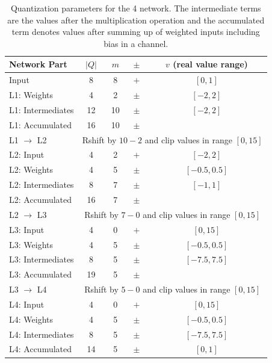 \begin{table}[hbt]
  \centering
  \begin{tabular}{lcccc}
	\toprule
    Network Part 	  & $|Q|$ & $m$ & $\pm$ & $v$ (real value range) \\
	\midrule
    Input 		 	  &  8    & 8  & $+$   & $[0,1]  $ \\
    L1: Weights 	  &  4    & 2  & $\pm$ & $[-2,2] $ \\
    L1: Intermediates & 12    & 10 & $\pm$ & $[-2,2] $ \\
    L1: Accumulated   & 16    & 10 & $\pm$ & 		   \\
    \midrule
    L1 $\to$ L2 	  & \multicolumn{4}{c}{Rshift by $10-2$ and clip values in range $[0,15]$} \\
    \midrule
    L2: Input 		  &  4    & 2  & $+$   & $[-2,2] $ 	   \\
    L2: Weights 	  &  4    & 5  & $\pm$ & $[-0.5,0.5] $ \\
    L2: Intermediates &  8    & 7  & $\pm$ & $[-1,1] $ \\
    L2: Accumulated   & 16    & 7  & $\pm$ &  			   \\
    \midrule
    L2 $\to$ L3 	  & \multicolumn{4}{c}{Rshift by $7-0$ and clip values in range $[0,15]$} \\
    \midrule
    L3: Input 		  &  4    & 0  & $+$   & $[0,15] $     \\
    L3: Weights 	  &  4    & 5  & $\pm$ & $[-0.5,0.5] $ \\
    L3: Intermediates &  8    & 5  & $\pm$ & $[-7.5,7.5] $ \\
    L3: Accumulated   & 19    & 5  & $\pm$ &               \\
    \midrule
    L3 $\to$ L4 	  & \multicolumn{4}{c}{Rshift by $5-0$ and clip values in range $[0,15]$} \\
    \midrule
    L4: Input 		  &  4    & 0  & $+$   & $[0,15] $ \\
    L4: Weights 	  &  4    & 5  & $\pm$ & $[-0.5,0.5] $ \\
    L4: Intermediates &  8    & 5  & $\pm$ & $[-7.5,7.5] $ \\
    L4: Accumulated   & 14    & 5  & $\pm$ & $[0,1] $ \\
    \bottomrule
  \end{tabular}
  \caption[Quantization parameters for the \SI{4}{\bit} network]{Quantization parameters for the \SI{4}{\bit} network. The intermediate terms are the values after the multiplication operation and the accumulated term denotes values after summing up of weighted inputs including bias in a channel.}
  \label{tab:quantization-linear-params}
\end{table}


